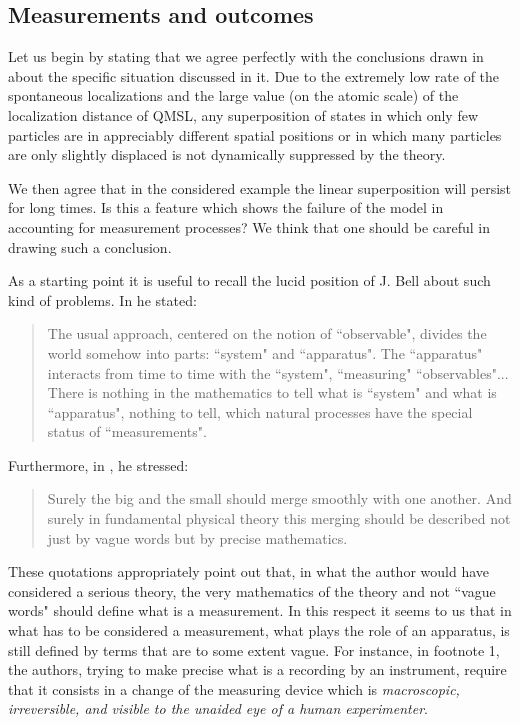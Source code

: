 \documentclass[10pt,a4paper]{article}
\begin{document}
\subsection{Measurements and outcomes} \label{sec142}

Let us begin by stating that we agree perfectly with the
conclusions drawn in \cite{avp} about the specific situation
discussed in it. Due to the extremely low rate of the spontaneous
localizations and the large value (on the atomic scale) of the
localization distance of QMSL, any superposition of states in
which only few particles are in appreciably different spatial
positions or in which many particles are only slightly displaced
is not dynamically suppressed by the theory.

We then agree that in the considered example the linear
superposition will persist for long times. Is this a feature which
shows the failure of the model in accounting for measurement
processes? We think that one should be careful in drawing such a
conclusion.

As a starting point it is useful to recall the lucid position of
J. Bell about such kind of problems. In \cite{bell84} he stated:
\begin{quotation}
The usual approach, centered on the notion of ``observable",
divides the world somehow into parts: ``system" and ``apparatus".
The ``apparatus" interacts from time to time with the ``system",
``measuring" ``observables"... There is nothing in the mathematics
to tell what is ``system" and what is ``apparatus", nothing to
tell, which natural processes have the special status of
``measurements".
\end{quotation}
Furthermore, in \cite{bellns}, he stressed:
\begin{quotation}
Surely the big and the small should merge smoothly with one
another. And surely in fundamental physical theory this merging
should be described not just by vague words but by precise
mathematics.
\end{quotation}

These quotations appropriately point out that, in what the author
would have considered a serious theory, the very mathematics of
the theory and not ``vague words" should define what is a
measurement. In this respect it seems to us that in \cite{avp}
what has to be considered a measurement, what plays the role of an
apparatus, is still defined by terms that are to some extent
vague. For instance, in footnote 1, the authors, trying to make
precise what is a recording by an instrument, require that it
consists in a change of the measuring device which is {\it
macroscopic, irreversible, and visible to the unaided eye of a
human experimenter}.
\end{document}

